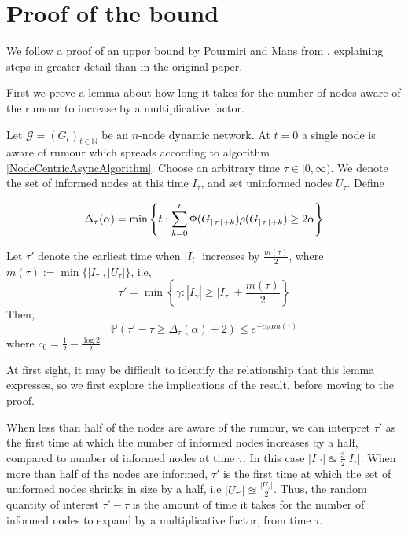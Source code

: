 \section{Proof of the bound}

We follow a proof of an upper bound by Pourmiri and Mans from \cite{asyncPaper}, explaining steps in greater detail than in the original paper.

First we prove a lemma about how long it takes for the number of nodes aware of the rumour to increase by a multiplicative factor. 

\begin{lemma} \label{AsyncIncreaseLemma}
	Let $\mathcal{G}=(G_t)_{t \in \mathbb{N}}$ be an $n$-node dynamic network. At $t=0$ a single node is aware of rumour which spreads according to algorithm \ref{NodeCentricAsyncAlgorithm}. Choose an arbitrary time $\tau \in [0, \infty)$. We denote the set of informed nodes at this time $I_\tau$, and set uninformed nodes $U_\tau$.
	\noindent
	Define 
	
	$$
	\Delta_\tau(\alpha) = \min \left\{t: \sum_{k=0}^t \Phi(G_{\lceil\tau\rceil+k})\rho(G_{\lceil\tau\rceil+k}) \geq 2 \alpha \right\}
	$$

	\noindent
	Let $\tau'$ denote the earliest time when $|I_t|$ increases by $\frac{m(\tau)}{2}$, where $m(\tau) := \min\{|I_\tau|, |U_\tau|\}$, i.e,
	$$
		\tau' = \min\left\{\gamma : |I_{\gamma}| \geq |I_\tau| + \frac{m(\tau)}{2}\right\}
	$$
	\noindent
	Then, 
	$$
		\mathbb{P}(\tau' - \tau \geq \Delta_\tau(\alpha) + 2) \leq e^{-c_0\alpha m(\tau)}
	$$
	\noindent
	where $c_0 = \frac{1}{2} - \frac{\log 2}{2}$
\end{lemma}

At first sight, it may be difficult to identify the relationship that this lemma expresses, so we first explore the implications of the result, before moving to the proof.

When less than half of the nodes are aware of the rumour, we can interpret $\tau'$ as the first time at which the number of informed nodes increases by a half, compared to number of informed nodes at time $\tau$. In this case $|I_{\tau'}| \approxeq \frac{3}{2} |I_\tau|$. When more than half of the nodes are informed, $\tau'$ is the first time at which the set of uniformed nodes shrinks in size by a half, i.e $|U_{\tau'}| \approxeq \frac{|U_\tau|}{2}$. Thus, the random quantity of interest $\tau'-\tau$ is the amount of time it takes for the number of informed nodes to expand by a multiplicative factor, from time $\tau$. 

